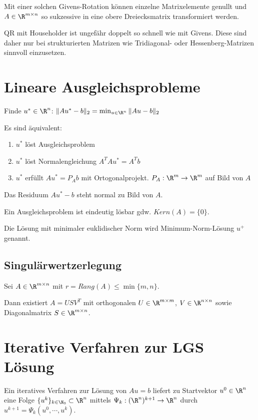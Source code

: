 Mit einer solchen Givens-Rotation können einzelne Matrixelemente genullt und $A \in \R^{m \times n}$ so sukzessive in eine obere Dreiecksmatrix transformiert werden.

QR mit Householder ist ungefähr doppelt so schnell wie mit Givens. Diese sind daher nur bei strukturierten Matrizen wie Tridiagonal- oder Hessenberg-Matrizen sinnvoll einzusetzen.

\section*{Lineare Ausgleichsprobleme}

Finde $u^* \in \R^n$: $\|Au^*-b\|_2 = \min_{u\in \R^n} \|Au-b\|_2$

Es sind äquivalent:

\begin{enumerate}[label=(\alph*)]
	\item $u^*$ löst Ausgleichsproblem
	\item $u^*$ löst Normalengleichung $A^TAu^*=A^Tb$
	\item $u^*$ erfüllt $Au^* = P_Ab$ mit Ortogonalprojekt. $P_A : \R^m \rightarrow \R^m$ auf Bild von $A$
\end{enumerate}

Das Residuum $Au^*-b$ steht normal zu Bild von $A$.

Ein Ausgleichsproblem ist eindeutig lösbar gdw. $Kern(A) = \{0\}$.

Die Lösung mit minimaler euklidischer Norm wird Minimum-Norm-Lösung $u^+$ genannt.

\subsection*{Singulärwertzerlegung}

Sei $A \in \R^{m \times n}$ mit $r=Rang(A) \leq \min\{m,n\}$.

Dann existiert $A=USV^T$ mit orthogonalen $U \in \R^{m \times m}$, $V \in \R^{n \times n}$ sowie Diagonalmatrix $S \in \R^{m \times n}$.

\section*{Iterative Verfahren zur LGS Lösung}

Ein iteratives Verfahren zur Lösung von $Au=b$ liefert zu Startvektor $u^0 \in \R^n$ eine Folge $\{u^k\}_{k\in \N_0} \subset \R^n$ mittels $\Psi_k : (\R^n)^{k+1} \rightarrow \R^n$ durch $u^{k+1} = \Psi_k(u^0, \cdots, u^k)$.

